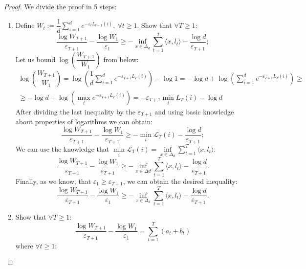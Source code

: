 \documentclass[12pt]{report}
\begin{document}
\begin{proof}
    We divide the proof in 5 steps:
    \begin{enumerate}
        \item Define $\displaystyle W_t := \dfrac{1}{d}\sum\limits_{i=1}^{d} e^{\displaystyle -\varepsilon_t L_{t-1}(i)}, \ \forall t \geq 1$. Show that $\forall T \geq 1$:
        \[
            \dfrac{\log W_{T+1}}{\varepsilon_{T+1}}  - \dfrac{\log W_1}{\varepsilon_1} \geq - \inf\limits_{x\in \Delta_d} \sum\limits_{t=1}^T \langle x, l_t \rangle - \dfrac{\log d}{\varepsilon_{T+1}};
        \]
        Let us bound $\log \left( \dfrac{W_{T+1}}{W_1}\right)$ from below:
        \[
            \begin{array}{c}
                \displaystyle \log \left( \dfrac{W_{T+1}}{W_1}\right) = \log (\dfrac{1}{d} \sum\limits_{i=1}^{d} e^{\displaystyle -\varepsilon_{T+1} L_T(i)}) - \log 1 = -\log d + \log (\sum\limits_{i=1}^{d} e^{\displaystyle -\varepsilon_{T+1} L_T(i)}) \geq \\[1cm] 
                \displaystyle \geq -\log d + \log (\max_i e^{\displaystyle -\varepsilon_{T+1} L_T(i)}) = -\varepsilon_{T + 1} \min_i L_T(i) - \log d        
            \end{array}
        \]
        After dividing the last inequality by the $\varepsilon_{T+1}$ and using basic knowledge about properties of logarithms we can obtain:
        \[
            \dfrac{\log W_{T+1}}{\varepsilon_{T+1}} - \dfrac{\log W_1}{\varepsilon_{T+1}} \geq -\min\limits_i \mathcal{L}_T(i) - \dfrac{\log d}{\varepsilon_{T+1}};  
        \]
        We can use the knowledge that $\displaystyle \min\limits_{i} \mathcal{L}_T(i) = \inf\limits_{x \in \Delta_d} \sum\limits_{t=1}^T \langle x, l_t\rangle$:
        \[
            \dfrac{\log W_{T+1}}{\varepsilon_{T+1}} - \dfrac{\log W_1}{\varepsilon_{T+1}} \geq -\inf\limits_{x \in \Delta d} \sum\limits_{t=1}^T \langle x, l_t \rangle - \dfrac{\log d}{\varepsilon_{T+1}}.
        \]
        Finally, as we know, that $\varepsilon_1 \geq \varepsilon_{T+1}$, we can obtain the desired inequality:
        \[
            \dfrac{\log W_{T+1}}{\varepsilon_{T+1}}  - \dfrac{\log W_1}{\varepsilon_1} \geq - \inf\limits_{x\in \Delta_d} \sum\limits_{t=1}^T \langle x, l_t \rangle - \dfrac{\log d}{\varepsilon_{T+1}}.
        \]
        \item Show that $\forall T \geq 1$:
        \[
            \dfrac{\log W_{T+1}}{\varepsilon_{T+1}} - \dfrac{\log W_1}{\varepsilon_1} = \sum\limits_{t=1}^T \left(a_t + b_t\right)  
        \]
        where $\forall t \geq 1$:

\end{enumerate}
\end{proof}
\end{document}
